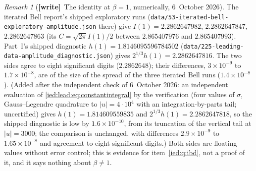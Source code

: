 \documentclass[11pt,letterpaper]{article}
\theoremstyle{remark}\newtheorem{remark}[theorem]{Remark}
\newcommand{\file}[1]{\nolinkurl{#1}}
\newcommand{\wtag}{\textup{\textbf{[write]}}}
\begin{document}
\begin{remark}[\wtag\ The identity at $\beta=1$, numerically, 6~October 2026]\label{ied:rem:ibdnumbers}
The iterated Bell report's shipped exploratory runs (\file{data/53-iterated-bell-exploratory-amplitude.json} there) give $I(1)=2.2862647982$, $2.2862647847$, $2.2862647863$ (its $C=\sqrt{2\pi}I(1)/2$ between $2.865407976$ and $2.865407993$). Part~I's shipped diagnostic $h(1)=1.8146095596784502$ (\file{data/225-leading-data-amplitude_diagnostic.json}) gives $2^{1/3}h(1)=2.2862647816$. The two sides agree to eight significant digits ($2.2862648$); their differences, $3\times10^{-9}$ to $1.7\times10^{-8}$, are of the size of the spread of the three iterated Bell runs ($1.4\times10^{-8}$). \textup{(Added after the independent check of 6~October 2026: an independent evaluation of \eqref{ied:lead:eq:constantintegral} by the verification (four values of $\sigma$, Gauss--Legendre quadrature to $|u|=4\cdot10^4$ with an integration-by-parts tail; uncertified) gives $h(1)=1.814609559835$ and $2^{1/3}h(1)=2.2862647818$, so the shipped diagnostic is low by $1.6\times10^{-10}$, from its truncation of the vertical tail at $|u|=3000$; the comparison is unchanged, with differences $2.9\times10^{-9}$ to $1.65\times10^{-8}$ and agreement to eight significant digits.)} Both sides are floating values without error control; this is evidence for item~\ref{ied:q:ibd}, not a proof of it, and it says nothing about $\beta\ne1$.
\end{remark}
\end{document}
